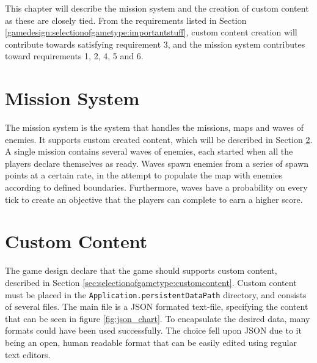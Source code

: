 This chapter will describe the mission system and the creation of custom content as these are closely tied.
From the requirements listed in Section \ref{gamedesign:selectionofgametype:importantstuff}, custom content creation will contribute towards satisfying requirement 3, and the mission system contributes toward requirements 1, 2, 4, 5 and 6.

\section{Mission System}
The mission system is the system that handles the missions, maps and waves of enemies.
It supports custom created content, which will be described in Section \ref{sec:modules:missions:customcontent}.
A single mission contains several waves of enemies, each started when all the players declare themselves as ready.
Waves spawn enemies from a series of spawn points at a certain rate, in the attempt to populate the map with enemies according to defined boundaries.
Furthermore, waves have a probability on every tick to create an objective that the players can complete to earn a higher score.

\section{Custom Content}\label{sec:modules:missions:customcontent}
The game design declare that the game should supports custom content, described in Section \ref{sec:selectionofgametype:customcontent}.
Custom content must be placed in the \texttt{Application\-.persistentDataPath} directory, and consists of several files.
The main file is a JSON formated text-file, specifying the content that can be seen in figure \ref{fig:json_chart}.
To encapsulate the desired data, many formats could have been used successfully.
The choice fell upon JSON due to it being an open, human readable format that can be easily edited using regular text editors.

